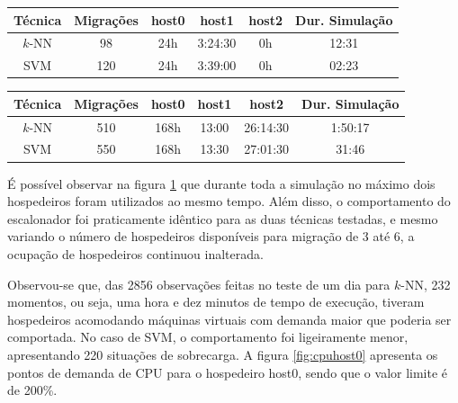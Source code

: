 \begin{table}[htp]
\centering
\hspace{-2cm} %
\label{quadro:simula0}
\begin{tabular}{| c | c | c | c | c | c |}
\hline
Técnica & Migrações & host0  & host1   & host2 & Dur. Simulação \\
\hline
$k$-NN 	& 98        & 24h    & 3:24:30 & 0h    & 12:31  \\
\hline
SVM 	& 120       & 24h    & 3:39:00 & 0h    & 02:23  \\
\hline
\end{tabular}
\end{table}

\begin{table}[htp]
\centering
\hspace{-2cm} %
\label{quadro:simula1}
\begin{tabular}{| c | c | c | c | c | c |}
\hline
Técnica & Migrações & host0  & host1    & host2       & Dur. Simulação \\
\hline
$k$-NN 	& 510        & 168h  & 13:00    & 26:14:30    & 1:50:17  \\
\hline
SVM 	& 550        & 168h  & 13:30 	& 27:01:30    & 31:46  \\
\hline
\end{tabular}
\end{table}

É possível observar na figura \ref{fig:svmhosts} que durante toda a simulação no
máximo dois hospedeiros foram utilizados ao mesmo tempo. Além disso, o
comportamento do escalonador foi praticamente idêntico para as duas técnicas
testadas, e mesmo variando o número de hospedeiros disponíveis para migração de
3 até 6, a ocupação de hospedeiros continuou inalterada.

\begin{figure}[htp]
\centering
{}
\label{fig:svmhosts}
\end{figure}

Observou-se que, das 2856 observações feitas no teste de um dia para $k$-NN, 232
momentos, ou seja, uma hora e dez minutos de tempo de execução, tiveram
hospedeiros acomodando máquinas virtuais com demanda maior que poderia ser
comportada. No caso de SVM, o comportamento foi ligeiramente menor, apresentando
220 situações de sobrecarga. A figura \ref{fig:cpuhost0} apresenta os pontos de
demanda de CPU para o hospedeiro host0, sendo que o valor limite é de 200\%.

